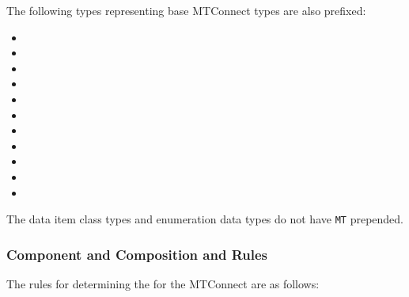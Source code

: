 The following types representing base MTConnect types are also prefixed:

\begin{itemize}
\setlength\itemsep{0em}
\item {}
\item {}
\item {}
\item {}
\item {}
\item {}
\item {}
\item {}
\item {}
\item {}
\item {}
\end{itemize}

The data item class types and enumeration data types do not have \texttt{MT} prepended.

\subsubsection{Component and Composition  and  Rules}

The rules for determining the  for the MTConnect  are as follows:

